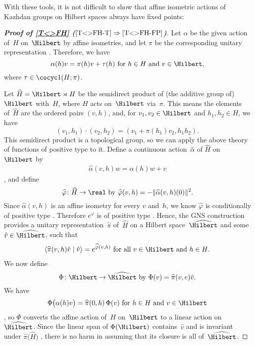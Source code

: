 With these tools, it is not difficult to show that affine isometric actions of Kazhdan groups on Hilbert spaces always have fixed points:

\begin{proof}[\bf {} Proof of \cref{T<>FH} ($\ref{T<>FH-T} \Rightarrow\ref{T<>FH-FP}$)]
Let $\alpha$ be the given action of~$H$ on~$\Hilbert$ by affine isometries, and let $\pi$ be the corresponding unitary representation . Therefore, we have
	$$ \text{$\alpha(h) v = \pi(h)v + \tau(h)$ for $h \in H$ and $v \in \Hilbert$,} $$
where $\tau \in \cocyc1(H;\pi)$.

Let $\widehat H = \Hilbert \rtimes H$ be the semidirect product of (the additive group of)~$\Hilbert$ with~$H$, where $H$ acts on~$\Hilbert$ via~$\pi$. This means the elements of~$\widehat H$ are the ordered pairs $(v,h)$, and, for $v_1,v_2 \in \Hilbert$ and $h_1,h_2 \in H$, we have
	$$ (v_1,h_1) \cdot  (v_2,h_2) = (v_1 + \pi(h_1) v_2, h_1 h_2 ) .$$
This semidirect product is a topological group, so we can apply the above theory of functions of positive type to it.
Define a continuous action~$\widehat\alpha$ of $\widehat H$ on~$\Hilbert$ by
	\begin{align} \label{T<>FH-alphahatdefn}
	\widehat\alpha(v,h)w = \alpha(h)w + v
	\end{align}
, and define
	$$ \text{$\widehat\varphi \colon \widehat H \to \real$ by $\widehat\varphi(v,h) = -\| \widehat\alpha(v,h)(0) \|^2$.} $$
Since $\widehat\alpha(v,h)$ is an affine isometry for every $v$ and~$h$, we know $\widehat\varphi$ is conditionally of positive type . Therefore $e^{\widehat\varphi}$ is of positive type . Hence, the GNS construction  provides a unitary representation~$\widehat\pi$ of~$\widehat H$ on a Hilbert space~$\widehat\Hilbert$ and some $\hat v \in \widehat \Hilbert$, such that 
	\begin{align} \label{T->FH-GNSEquality}
	\text{$\langle \widehat\pi(v,h) \hat v \mid \hat v \rangle = e^{\widehat\varphi(v,h)}$ for all $v \in \Hilbert$ and $h \in H$.} 
	\end{align}
We now define
	$$ \text{$\Phi \colon \Hilbert \to \widehat\Hilbert$ by
	$ \Phi(v) = \widehat\pi(v,e) \hat v $} .$$
We have
	\begin{align} \label{T<>FH-PhiIsEqui}
	\text{$\Phi \bigl( \alpha(h)v \bigr) = \widehat\pi( 0,h ) \, \Phi(v)$ for $h \in H$ and $v \in \Hilbert$} 
	\end{align}
, so $\Phi$ converts the affine action of~$H$ on~$\Hilbert$ to a linear action on~$\widehat\Hilbert$.
Since the linear span of $\Phi(\Hilbert)$ contains~$\hat v$ and is invariant under $\widehat\pi \bigl( \widehat H \bigr)$  , there is no harm in assuming that its closure is all of~$\widehat\Hilbert$.



\end{proof}
